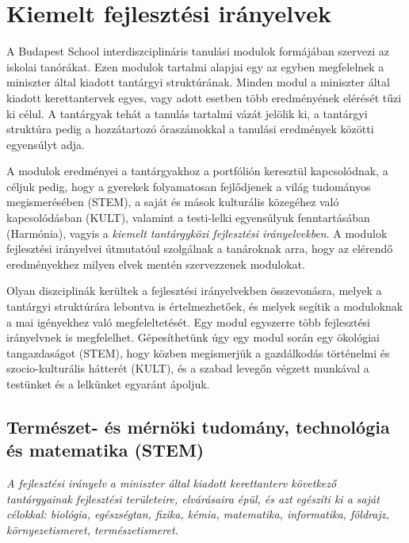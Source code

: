 \section{Kiemelt fejlesztési irányelvek}
\label{sec:kiemelt_fejlesztesi_iranyelvek}
A Budapest School interdiszciplináris tanulási modulok formájában szervezi az iskolai tanórákat. Ezen modulok tartalmi alapjai egy az egyben megfelelnek a miniszter által kiadott tantárgyi struktúrának. Minden modul a miniszter által kiadott kerettantervek egyes, vagy adott esetben több eredményének elérését tűzi ki célul. A tantárgyak tehát a tanulás tartalmi vázát jelölik ki, a tantárgyi struktúra pedig a hozzátartozó óraszámokkal a tanulási eredmények közötti egyensúlyt adja. 

A modulok eredményei a tantárgyakhoz a portfólión keresztül kapcsolódnak, a céljuk pedig, hogy a gyerekek folyamatosan fejlődjenek a világ tudományos megismerésében (STEM), a saját és mások kulturális közegéhez való kapcsolódásban (KULT), valamint a testi-lelki egyensúlyuk fenntartásában (Harmónia), vagyis a \emph{kiemelt tantárgyközi fejlesztési irányelvekben}. A modulok fejlesztési irányelvei útmutatóul szolgálnak a tanároknak arra, hogy az elérendő eredményekhez milyen elvek mentén szervezzenek modulokat. 

Olyan diszciplinák kerültek a fejlesztési irányelvekben összevonásra, melyek a tantárgyi struktúrára lebontva is értelmezhetőek, és melyek segítik a moduloknak a mai igényekhez való megfeleltetését. Egy modul egyszerre több fejlesztési irányelvnek is megfelelhet. Gépesíthetünk úgy egy modul során egy ökológiai tangazdaságot (STEM), hogy közben megismerjük a gazdálkodás történelmi és szocio-kulturális hátterét (KULT), és a szabad levegőn végzett munkával a testünket és a lelkünket egyaránt ápoljuk.   


\subsection[STEM]{Természet- és mérnöki	tudomány, technológia és
  matematika
  (STEM)}%
\emph{A fejlesztési irányelv a miniszter által kiadott kerettanterv következő tantárgyainak fejlesztési területeire, elvárásaira épül, és azt egészíti ki a saját célokkal: biológia, egészségtan, fizika, kémia, matematika, informatika, földrajz, környezetismeret, természetismeret.}

